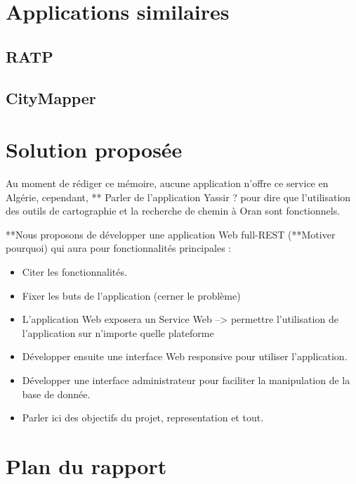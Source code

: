 		\section{Applications similaires}			
		\subsection{RATP}
		
		\subsection{CityMapper}
		
			
		\section{Solution proposée}
		Au moment de rédiger ce mémoire, aucune application n'offre ce service en Algérie, cependant, ** Parler de l'application Yassir ? pour dire que l'utilisation des outils de cartographie et la recherche de chemin à Oran sont fonctionnels.
		
		
		**Nous proposons de développer une application Web full-REST (**Motiver pourquoi) qui aura pour fonctionnalités principales : 
		\begin{itemize}
		\item Citer les fonctionnalités.
		\item Fixer les buts de l'application (cerner le problème)
		\item L'application Web exposera un Service Web --> permettre l'utilisation de l'application sur n'importe quelle plateforme 
		\item Développer ensuite une interface Web responsive pour utiliser l'application.
		\item Développer une interface administrateur pour faciliter la manipulation de la  base de donnée.
		\item Parler ici des objectifs du projet, representation et tout.
		\end{itemize}
		 
		 
		 \newpage
		 \section{Plan du rapport}
